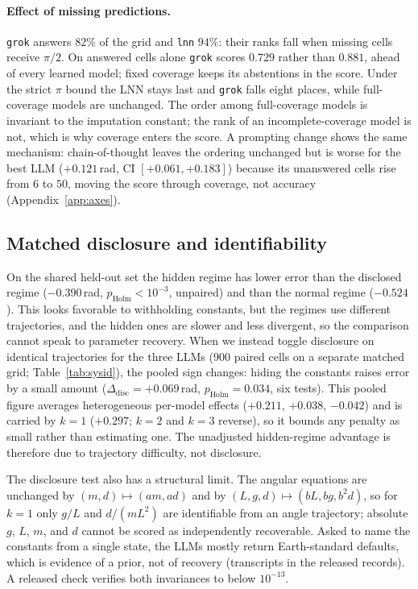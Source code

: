\documentclass{article}
\begin{document}
\paragraph{Effect of missing predictions.} \texttt{grok} answers $82\%$ of the grid and
\texttt{lnn} $94\%$: their ranks fall when missing cells receive $\pi/2$. On answered cells
alone \texttt{grok} scores $0.729$ rather than $0.881$, ahead of every learned model; fixed
coverage keeps its abstentions in the score. Under the strict $\pi$ bound the LNN stays last
and \texttt{grok} falls eight places, while full-coverage models are unchanged. The order among
full-coverage models is invariant to the imputation constant; the rank of an incomplete-coverage
model is not, which is why coverage enters the score. A prompting change shows the same
mechanism: chain-of-thought leaves the ordering unchanged but is worse for the best LLM
($+0.121$\,rad, CI $[+0.061,+0.183]$) because its unanswered cells rise from $6$ to $50$,
moving the score through coverage, not accuracy (Appendix~\ref{app:axes}).

\subsection{Matched disclosure and identifiability}
\label{sec:sysid}
On the shared held-out set the hidden regime has lower error than the disclosed regime
($-0.390$\,rad, $p_{\mathrm{Holm}}{<}10^{-3}$, unpaired) and than the normal regime
($-0.524$). This looks favorable to withholding constants, but the regimes use different
trajectories, and the hidden ones are slower and less divergent, so the comparison cannot
speak to parameter recovery. When we instead toggle disclosure on identical trajectories for
the three LLMs ($900$ paired cells on a separate matched grid; Table~\ref{tab:sysid}), the
pooled sign changes: hiding the constants raises error by a small amount
($\Delta_{\mathrm{disc}}{=}{+}0.069$\,rad, $p_{\mathrm{Holm}}{=}0.034$, six tests). This pooled
figure averages heterogeneous per-model effects ($+0.211$, $+0.038$, $-0.042$) and is carried by
$k{=}1$ ($+0.297$; $k{=}2$ and $k{=}3$ reverse), so it bounds any penalty as small rather than
estimating one. The unadjusted hidden-regime advantage is therefore due to trajectory
difficulty, not disclosure.

The disclosure test also has a structural limit. The angular equations are unchanged by
$(m,d)\mapsto(am,ad)$ and by $(L,g,d)\mapsto(bL,bg,b^2d)$, so for $k{=}1$ only $g/L$ and
$d/(mL^2)$ are identifiable from an angle trajectory; absolute $g$, $L$, $m$, and $d$ cannot
be scored as independently recoverable. Asked to name the constants from a single state, the
LLMs mostly return Earth-standard defaults, which is evidence of a prior, not of recovery
(transcripts in the released records). A released check verifies both invariances to below
$10^{-13}$.
\end{document}
